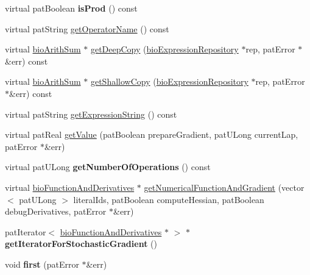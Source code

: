 \begin{DoxyCompactItemize}
\item 
\mbox{\label{classbio_arith_sum_a44affda18b23bdbfae680143df4293cb}} 
virtual pat\+Boolean {\bfseries is\+Prod} () const
\item 
virtual pat\+String \hyperlink{classbio_arith_sum_a9e0ab0b9062a7cd80e70fc16505bc282}{get\+Operator\+Name} () const
\item 
virtual \hyperlink{classbio_arith_sum}{bio\+Arith\+Sum} $\ast$ \hyperlink{classbio_arith_sum_ab3264f5810c52c59b96ae72370e441ff}{get\+Deep\+Copy} (\hyperlink{classbio_expression_repository}{bio\+Expression\+Repository} $\ast$rep, pat\+Error $\ast$\&err) const
\item 
virtual \hyperlink{classbio_arith_sum}{bio\+Arith\+Sum} $\ast$ \hyperlink{classbio_arith_sum_a0828ed33f49201118b143dfa336d9212}{get\+Shallow\+Copy} (\hyperlink{classbio_expression_repository}{bio\+Expression\+Repository} $\ast$rep, pat\+Error $\ast$\&err) const
\item 
virtual pat\+String \hyperlink{classbio_arith_sum_a1354d70bccf4ba5e3d8ca634005d5489}{get\+Expression\+String} () const
\item 
virtual pat\+Real \hyperlink{classbio_arith_sum_a3705cb2f1aebf4541131df5638a33379}{get\+Value} (pat\+Boolean prepare\+Gradient, pat\+U\+Long current\+Lap, pat\+Error $\ast$\&err)
\item 
\mbox{\label{classbio_arith_sum_ab192ab3a089be64024a110d94a341fb3}} 
virtual pat\+U\+Long {\bfseries get\+Number\+Of\+Operations} () const
\item 
virtual \hyperlink{classbio_function_and_derivatives}{bio\+Function\+And\+Derivatives} $\ast$ \hyperlink{classbio_arith_sum_afe9b54bab626e9dbe2b3aefebbcb6f8f}{get\+Numerical\+Function\+And\+Gradient} (vector$<$ pat\+U\+Long $>$ literal\+Ids, pat\+Boolean compute\+Hessian, pat\+Boolean debug\+Derivatives, pat\+Error $\ast$\&err)
\item 
\mbox{\label{classbio_arith_sum_a6defac5816d2b12e96482a97b2c08484}} 
pat\+Iterator$<$ \hyperlink{classbio_function_and_derivatives}{bio\+Function\+And\+Derivatives} $\ast$ $>$ $\ast$ {\bfseries get\+Iterator\+For\+Stochastic\+Gradient} ()
\item 
\mbox{\label{classbio_arith_sum_aba70598e4a7de1d36d34c6bb693a3ebf}} 
void {\bfseries first} (pat\+Error $\ast$\&err)

\end{DoxyCompactItemize}
